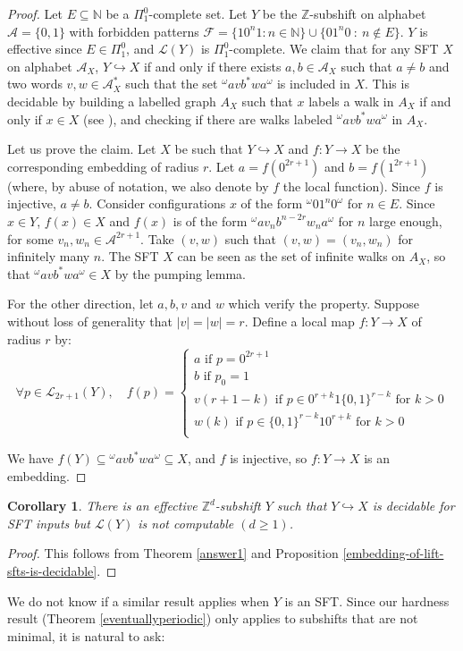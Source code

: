 \documentclass[a4paper]{article}
\newcommand{\F}{\mathcal{F}}
\newcommand{\Le}{\mathcal{L}}
\newcommand{\Z}{\mathbb{Z}}
\newcommand{\Zd}{\mathbb{Z}^d}
\newcommand{\N}{\mathbb{N}}
\newcommand{\A}{\mathcal{A}}
\newtheorem{corollary}[theorem]{Corollary}
\theoremstyle{definition}
\begin{document}
\begin{proof}
Let $E \subseteq \N$ be a $\Pi^0_1$-complete set. Let $Y$ be the $\Z$-subshift on alphabet $\A=\{0,1\}$ with forbidden patterns $\F=\{10^n1 : n\in\N\} \cup \{01^n0 \ : \ n \notin E\}$. $Y$ is effective since $E \in \Pi^0_1$, and $\Le(Y)$ is $\Pi^0_1$-complete. We claim that for any SFT $X$ on alphabet $\A_X$, $Y \hookrightarrow X$ if and only if there exists $a,b\in \A_X$ such that $a \neq b$ and two words $v, w \in \A_X^*$ such that the set ${}^{\omega}avb^*wa^{\omega}$ is included in $X$. This is decidable by building a labelled graph $A_X$ such that $x$ labels a walk in $A_X$ if and only if $x \in X$ (see \cite[Theorem 2.3.2]{lind_introduction_1995}), and checking if there are walks labeled ${}^{\omega}avb^*wa^{\omega}$ in $A_X$.

Let us prove the claim. Let $X$ be such that $Y \hookrightarrow X$ and $f: Y \rightarrow X$ be the corresponding embedding of radius $r$. Let $a=f(0^{2r+1})$ and $b=f(1^{2r+1})$ (where, by abuse of notation, we also denote by $f$ the local function). Since $f$ is injective, $a \neq b$. Consider configurations $x$ of the form ${}^{\omega}01^n0^{\omega}$ for $n \in E$. Since $x \in Y$, $f(x) \in X$ and $f(x)$ is of the form ${}^{\omega}av_nb^{n-2r}w_na^{\omega}$ for $n$ large enough, for some $v_n,w_n\in\A^{2r+1}$. Take $(v,w)$ such that $(v,w) = (v_n,w_n)$ for infinitely many $n$. The SFT $X$ can be seen as the set of infinite walks on $A_X$, so that ${}^{\omega}avb^*wa^{\omega} \in X$ by the pumping lemma.

For the other direction, let $a, b, v$ and $w$ which verify the property. Suppose without loss of generality that $|v|=|w|=r$. Define a local map $f:Y \rightarrow X$ of radius $r$ by: 
\[\forall p \in \Le_{2r+1}(Y),\quad f(p) = 
\begin{cases}
    a \text{ if } p=0^{2r+1}\\
    b \text{ if } p_0=1\\
    v(r+1-k)\text{ if }p \in 0^{r+k} 1\{0,1\}^{r-k}\text{ for }k>0\\
    w(k)\text{ if }p \in \{0,1\}^{r-k}10^{r+k}\text{ for }k>0\\
\end{cases}\]

We have $f(Y) \subseteq {}^{\omega}avb^*wa^{\omega} \subseteq X$, and $f$ is injective, so $f:Y \rightarrow X$ is an embedding.
\end{proof}
\begin{corollary}
    There is an effective $\Zd$-subshift $Y$ such that $Y\hookrightarrow X$ is decidable for SFT inputs but $\Le(Y)$ is not computable $(d\geq 1)$. 
\end{corollary}
\begin{proof}
This follows from Theorem \ref{answer1} and Proposition \ref{embedding-of-lift-sfts-is-decidable}.
\end{proof}
We do not know if a similar result applies when $Y$ is an SFT. Since our hardness result (Theorem \ref{eventuallyperiodic}) only applies to subshifts that are not minimal, it is natural to ask:
\end{document}
